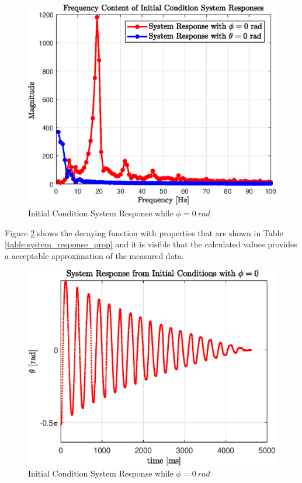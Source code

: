 \documentclass[a4paper,12pt]{article}
\begin{document}
		\begin{figure}[h]
			\centering
			\includegraphics[scale=0.8]{FFT_system.eps}
			\caption{Initial Condition System Response while $ \phi = \SI{0}{rad} $ }
			\label{fig:fft_system_response}
		\end{figure}
	
	Figure \ref{fig:q1_response} shows the decaying function with properties that are shown in Table \ref{table:system_response_prop} and it is visible that the calculated values provides a acceptable approximation of the measured data.
	
	\begin{figure}[h]
		\centering
		\includegraphics[scale=0.5]{q1_initial_response.eps}
		\caption{Initial Condition System Response while $ \phi = \SI{0}{rad} $ }
		\label{fig:q1_response}
	\end{figure}
	
\end{document}
